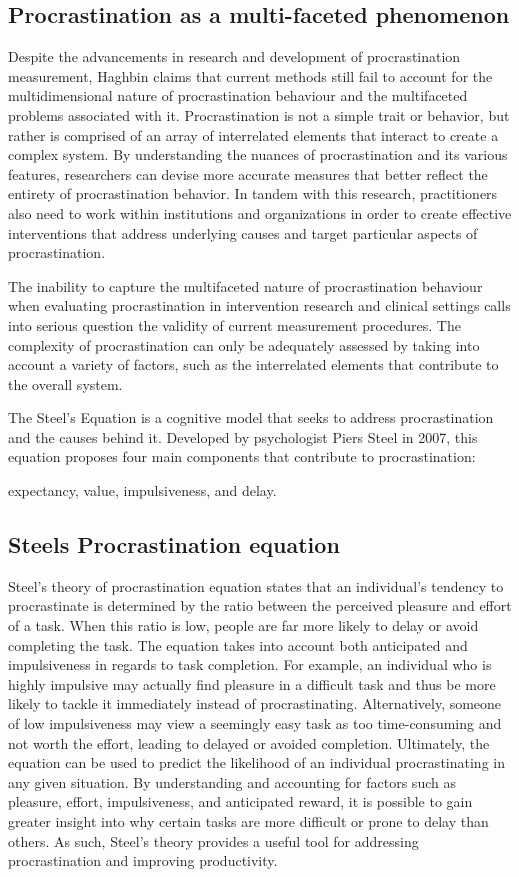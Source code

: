 \subsection{Procrastination as a multi-faceted phenomenon}

Despite the advancements in research and development of procrastination measurement,
Haghbin \cite{Haghbin2015} claims that current methods still fail to account for the multidimensional nature of procrastination behaviour and the multifaceted
problems associated with it. Procrastination is not a simple trait or behavior,
but rather is comprised of an array of interrelated elements that interact to create a complex system.
By understanding the nuances of procrastination and its various features, researchers can devise more accurate measures
that better reflect the entirety of procrastination behavior. In tandem with this research,
practitioners also need to work within institutions and organizations in order to create effective
interventions that address underlying causes and target particular aspects of procrastination.

The inability to capture the multifaceted nature of procrastination behaviour when evaluating procrastination
in intervention research and clinical settings calls into serious question the validity of current measurement procedures.
The complexity of procrastination can only be adequately assessed by taking into account a variety of factors,
such as the interrelated elements that contribute to the overall system.

The Steel's Equation is a cognitive model that seeks to address procrastination and the causes behind it.
Developed by psychologist Piers Steel in 2007, this equation proposes four main components that contribute to procrastination:

expectancy, value, impulsiveness, and delay.


\subsection{Steels Procrastination equation}

Steel’s theory of procrastination equation states that an individual’s
tendency to procrastinate is determined by the ratio between the perceived
pleasure and effort of a task. When this ratio is low,
people are far more likely to delay or avoid completing the task. The equation takes into account
both anticipated and impulsiveness in regards to task completion.
For example, an individual who is highly impulsive may actually find pleasure in
a difficult task and thus be more likely to tackle it immediately instead of procrastinating.
Alternatively, someone of low impulsiveness may view a
seemingly easy task as too time-consuming and not worth the effort,
leading to delayed or avoided completion.
Ultimately, the equation can be used to predict the likelihood of an individual procrastinating in any given situation.
By understanding and accounting for factors such as pleasure, effort,
impulsiveness, and anticipated reward,
it is possible to gain greater insight into why certain tasks are more difficult or prone to delay than others.
As such, Steel’s theory provides a useful tool for addressing procrastination and improving productivity.

